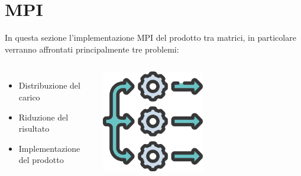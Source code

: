 \documentclass[compress]{beamer}
\begin{document}
\section{MPI}

\begin{frame}{\secname}
    In questa sezione l'implementazione MPI del prodotto tra matrici, in particolare verranno affrontati principalmente tre problemi:
    \vspace{0.5cm}
    \begin{columns}
            \begin{minipage}[b]{1\textwidth}
                \begin{itemize}
                    \item Distribuzione del carico
                    \item Riduzione del risultato
                    \item Implementazione del prodotto
                \end{itemize}
            \end{minipage}
                \begin{minipage}{1\textwidth}
                    \begin{adjustbox}{margin=0cm 0cm 0cm 0.3cm, center} %
                        \includegraphics[width=0.5\textwidth]{resources/parallel_icon.png}
                    \end{adjustbox}
                \end{minipage}
    \end{columns}
\end{frame}
\end{document}

